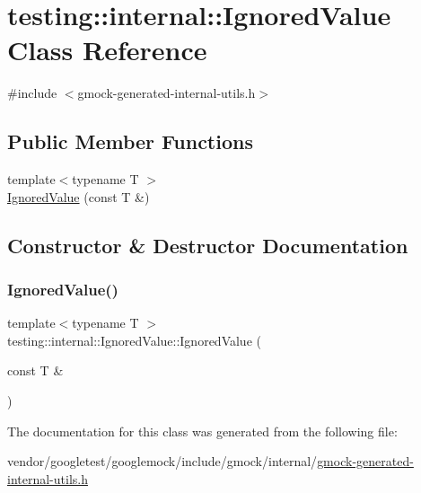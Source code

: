 \hypertarget{classtesting_1_1internal_1_1_ignored_value}{}\section{testing\+:\+:internal\+:\+:Ignored\+Value Class Reference}
\label{classtesting_1_1internal_1_1_ignored_value}


{\ttfamily \#include $<$gmock-\/generated-\/internal-\/utils.\+h$>$}

\subsection*{Public Member Functions}
\begin{DoxyCompactItemize}
\item 
{\footnotesize template$<$typename T $>$ }\\\hyperlink{classtesting_1_1internal_1_1_ignored_value_a6c72839c07a9da8d027efb253144bd91}{Ignored\+Value} (const T \&)
\end{DoxyCompactItemize}


\subsection{Constructor \& Destructor Documentation}
\mbox{\label{classtesting_1_1internal_1_1_ignored_value_a6c72839c07a9da8d027efb253144bd91}} 
\subsubsection{\texorpdfstring{Ignored\+Value()}{IgnoredValue()}}
{\footnotesize\ttfamily template$<$typename T $>$ \\
testing\+::internal\+::\+Ignored\+Value\+::\+Ignored\+Value (\begin{DoxyParamCaption}\item[{const T \&}]{ }\end{DoxyParamCaption})\hspace{0.3cm}{\ttfamily [inline]}}



The documentation for this class was generated from the following file\+:\begin{DoxyCompactItemize}
\item 
vendor/googletest/googlemock/include/gmock/internal/\hyperlink{gmock-generated-internal-utils_8h}{gmock-\/generated-\/internal-\/utils.\+h}\end{DoxyCompactItemize}
